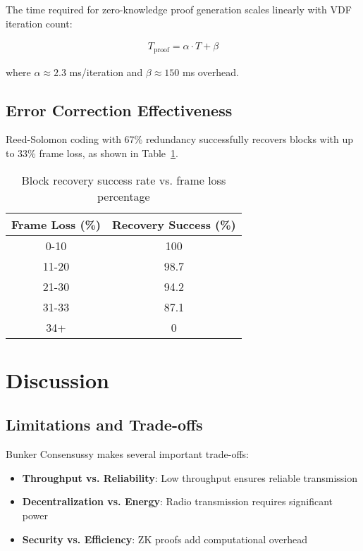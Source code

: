 \documentclass[11pt,a4paper]{article}
\begin{document}
The time required for zero-knowledge proof generation scales linearly with VDF iteration count:

\begin{align}
T_{\text{proof}} = \alpha \cdot T + \beta
\end{align}

where $\alpha \approx 2.3$ ms/iteration and $\beta \approx 150$ ms overhead.

\subsection{Error Correction Effectiveness}

Reed-Solomon coding with 67\% redundancy successfully recovers blocks with up to 33\% frame loss, as shown in Table~\ref{tab:error_correction}.

\begin{table}[h]
\centering
\caption{Block recovery success rate vs. frame loss percentage}
\label{tab:error_correction}
\begin{tabular}{@{}cc@{}}
\toprule
Frame Loss (\%) & Recovery Success (\%) \\
\midrule
0-10 & 100 \\
11-20 & 98.7 \\
21-30 & 94.2 \\
31-33 & 87.1 \\
34+ & 0 \\
\bottomrule
\end{tabular}
\end{table}

\section{Discussion}

\subsection{Limitations and Trade-offs}

Bunker Consensussy makes several important trade-offs:

\begin{itemize}
\item \textbf{Throughput vs. Reliability}: Low throughput ensures reliable transmission
\item \textbf{Decentralization vs. Energy}: Radio transmission requires significant power
\item \textbf{Security vs. Efficiency}: ZK proofs add computational overhead
\end{itemize}
\end{document}
